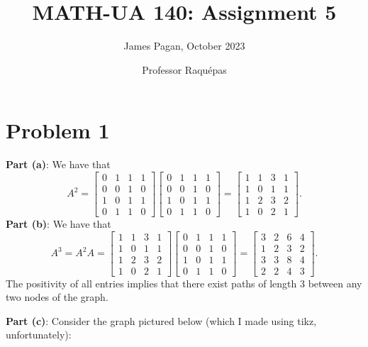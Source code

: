 \documentclass[11pt]{article}
\title{MATH-UA 140: Assignment 5}
\author{James Pagan, October 2023}
\date{Professor Raquépas}
\begin{document}
\maketitle
\tableofcontents


\section{Problem 1}

\textbf{Part (a)}: We have that
\[
	A^{2} = \begin{bmatrix} 0 & 1 & 1 & 1 \\ 0 & 0 & 1 & 0 \\ 1 & 0 & 1 & 1 \\ 0 & 1 & 1 & 0 \end{bmatrix} \begin{bmatrix} 0 & 1 & 1 & 1 \\ 0 & 0 & 1 & 0 \\ 1 & 0 & 1 & 1 \\ 0 & 1 & 1 & 0 \end{bmatrix} = \begin{bmatrix} 1 & 1 & 3 & 1 \\ 1 & 0 & 1 & 1 \\ 1 & 2 & 3 & 2 \\ 1 & 0 & 2 & 1 \end{bmatrix}.
\]
\textbf{Part (b)}: We have that
\[
	A^{3} = A^{2} A = \begin{bmatrix} 1 & 1 & 3 & 1 \\ 1 & 0 & 1 & 1 \\ 1 & 2 & 3 & 2 \\ 1 & 0 & 2 & 1 \end{bmatrix} \begin{bmatrix} 0 & 1 & 1 & 1 \\ 0 & 0 & 1 & 0 \\ 1 & 0 & 1 & 1 \\ 0 & 1 & 1 & 0 \end{bmatrix} = \begin{bmatrix} 3 & 2 & 6 & 4 \\ 1 & 2 & 3 & 2 \\ 3 & 3 & 8 & 4 \\ 2 & 2 & 4 & 3 \end{bmatrix}.
\]
The positivity of all entries implies that there exist paths of length $3$ between any two nodes of the graph.

\textbf{Part (c)}: Consider the graph pictured below (which I made using tikz, unfortunately):
\end{document}
